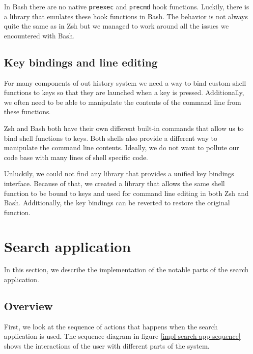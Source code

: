 In Bash there are no native \verb|preexec| and \verb|precmd| hook functions. Luckily, there is a library \cite{lib-bash-preexec} that emulates these hook functions in Bash. The behavior is not always quite the same as in Zsh but we managed to work around all the issues we encountered with Bash.  

\subsection{Key bindings and line editing}

For many components of out history system we need a way to bind custom shell functions to keys so that they are launched when a key is pressed. Additionally, we often need to be able to manipulate the contents of the command line from these functions.

Zsh and Bash both have their own different built-in commands that allow us to bind shell functions to keys. Both shells also provide a different way to manipulate the command line contents. Ideally, we do not want to pollute our code base with many lines of shell specific code.

Unluckily, we could not find any library that provides a unified key bindings interface. Because of that, we created a library\cite{lib-bash-zsh-compat-widgets} that allows the same shell function to be bound to keys and used for command line editing in both Zsh and Bash. Additionally, the key bindings can be reverted to restore the original function.



\section{Search application}

In this section, we describe the implementation of the notable parts of the search application. 

\subsection{Overview}

First, we look at the sequence of actions that happens when the search application is used. The sequence diagram in figure \ref{impl-search-app-sequence} shows the interactions of the user with different parts of the system.

